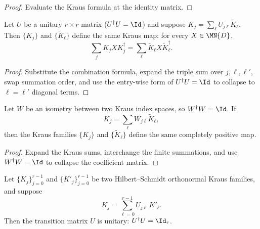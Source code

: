 \begin{proof}\leanok
    Evaluate the Kraus formula at the identity matrix.
\end{proof}

\begin{theorem}\label{thm:kraus_same_map_of_unitary_combination}
    \leanok
    Let $U$ be a unitary $r \times r$ matrix ($U^\dagger U = \Id$)
    and suppose $K_j = \sum_\ell U_{j\ell} \tilde{K}_\ell$.
    Then $\{K_j\}$ and $\{\tilde{K}_\ell\}$ define the same Kraus map:
    for every $X \in \MN{D}$,
    \[
        \sum_j K_j X K_j^\dagger
        = \sum_\ell \tilde{K}_\ell X \tilde{K}_\ell^\dagger.
    \]
\end{theorem}

\begin{proof}
    \leanok
    Substitute the combination formula, expand the triple sum over
    $j,\ell,\ell'$, swap summation order, and use the entry-wise form
    of $U^\dagger U = \Id$ to collapse to $\ell = \ell'$ diagonal terms.
\end{proof}

\begin{theorem}
    \label{thm:kraus_same_map_of_isometry_combination}
    \leanok
    Let $W$ be an isometry between two Kraus index spaces, so $W^\dagger W = \Id$.
    If
    \[
        K_j = \sum_\ell W_{j\ell} \widetilde K_\ell,
    \]
    then the Kraus families $\{K_j\}$ and $\{\widetilde K_\ell\}$ define the
    same completely positive map.
\end{theorem}

\begin{proof}\leanok
    Expand the Kraus sums, interchange the finite summations, and use
    $W^\dagger W = \Id$ to collapse the coefficient matrix.
\end{proof}

\begin{theorem}\label{thm:kraus_transition_unitary_of_hs_orthonormal}
    \leanok
    Let $\{K_j\}_{j=0}^{r-1}$ and $\{K'_j\}_{j=0}^{r-1}$ be two
    Hilbert--Schmidt orthonormal Kraus families, and suppose
    \[
        K_j = \sum_{\ell=0}^{r-1} U_{j\ell}\,K'_\ell.
    \]
    Then the transition matrix $U$ is unitary:
    $U^\dagger U = \Id_r$.
\end{theorem}

